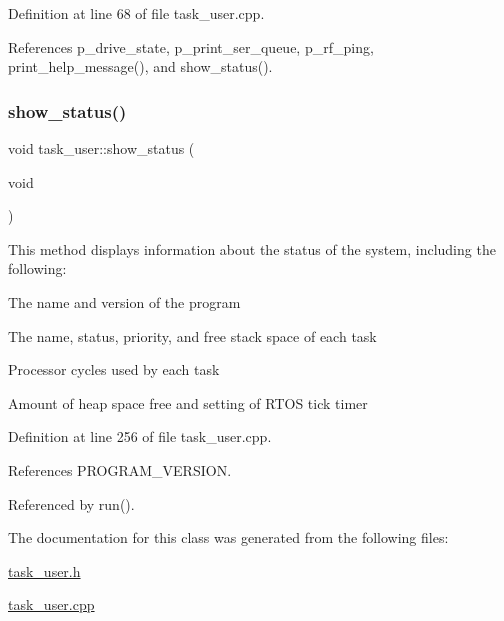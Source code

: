 Definition at line 68 of file task\+\_\+user.\+cpp.



References p\+\_\+drive\+\_\+state, p\+\_\+print\+\_\+ser\+\_\+queue, p\+\_\+rf\+\_\+ping, print\+\_\+help\+\_\+message(), and show\+\_\+status().

\mbox{\label{classtask__user_a105bebbd9cb1031154c3dfc3662db4a0}} 
\subsubsection{\texorpdfstring{show\+\_\+status()}{show\_status()}}
{\footnotesize\ttfamily void task\+\_\+user\+::show\+\_\+status (\begin{DoxyParamCaption}\item[{void}]{ }\end{DoxyParamCaption})\hspace{0.3cm}{\ttfamily [protected]}}

This method displays information about the status of the system, including the following\+: \begin{DoxyItemize}
\item The name and version of the program \item The name, status, priority, and free stack space of each task \item Processor cycles used by each task \item Amount of heap space free and setting of R\+T\+OS tick timer \end{DoxyItemize}


Definition at line 256 of file task\+\_\+user.\+cpp.



References P\+R\+O\+G\+R\+A\+M\+\_\+\+V\+E\+R\+S\+I\+ON.



Referenced by run().



The documentation for this class was generated from the following files\+:\begin{DoxyCompactItemize}
\item 
\mbox{\hyperlink{task__user_8h}{task\+\_\+user.\+h}}\item 
\mbox{\hyperlink{task__user_8cpp}{task\+\_\+user.\+cpp}}\end{DoxyCompactItemize}
